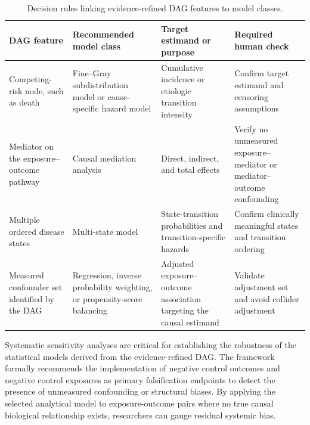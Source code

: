 \documentclass[sn-vancouver-num]{sn-jnl}
\begin{document}
\begin{table}[h]
\caption{Decision rules linking evidence-refined DAG features to model classes.}
\label{tab:model-rules}
\centering
\footnotesize
\setlength{\tabcolsep}{4pt}
\renewcommand{\arraystretch}{1.15}
\begin{tabularx}{\textwidth}{@{}>{\raggedright\arraybackslash}p{3.0cm}YYY@{}}
\toprule
\textbf{DAG feature} & \textbf{Recommended model class} & \textbf{Target estimand or purpose} & \textbf{Required human check} \\
\midrule
Competing-risk node, such as death & Fine--Gray subdistribution model or cause-specific hazard model & Cumulative incidence or etiologic transition intensity & Confirm target estimand and censoring assumptions \\
\addlinespace[2pt]
Mediator on the exposure--outcome pathway & Causal mediation analysis & Direct, indirect, and total effects & Verify no unmeasured exposure--mediator or mediator--outcome confounding \\
\addlinespace[2pt]
Multiple ordered disease states & Multi-state model & State-transition probabilities and transition-specific hazards & Confirm clinically meaningful states and transition ordering \\
\addlinespace[2pt]
Measured confounder set identified by the DAG & Regression, inverse probability weighting, or propensity-score balancing & Adjusted exposure--outcome association targeting the causal estimand & Validate adjustment set and avoid collider adjustment \\
\bottomrule
\end{tabularx}
\end{table}

Systematic sensitivity analyses are critical for establishing the robustness of the statistical models derived from the evidence-refined DAG. The framework formally recommends the implementation of negative control outcomes and negative control exposures as primary falsification endpoints to detect the presence of unmeasured confounding or structural biases. By applying the selected analytical model to exposure-outcome pairs where no true causal biological relationship exists, researchers can gauge residual systemic bias. 
\end{document}
